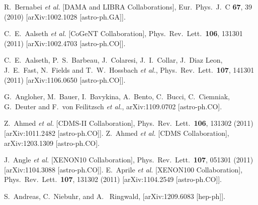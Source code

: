   R.~Bernabei {\it et al.}  [DAMA and LIBRA Collaborations],
  Eur.\ Phys.\ J.\ C {\bf 67}, 39 (2010)
  [arXiv:1002.1028 [astro-ph.GA]].

  C.~E.~Aalseth {\it et al.}  [CoGeNT Collaboration],
  Phys.\ Rev.\ Lett.\  {\bf 106}, 131301 (2011)
  [arXiv:1002.4703 [astro-ph.CO]].

  C.~E.~Aalseth, P.~S.~Barbeau, J.~Colaresi, J.~I.~Collar, J.~Diaz Leon, J.~E.~Fast, N.~Fields and T.~W.~Hossbach {\it et al.},
  Phys.\ Rev.\ Lett.\  {\bf 107}, 141301 (2011)
  [arXiv:1106.0650 [astro-ph.CO]].

  G.~Angloher, M.~Bauer, I.~Bavykina, A.~Bento, C.~Bucci, C.~Ciemniak, G.~Deuter and F.~von Feilitzsch {\it et al.},
  arXiv:1109.0702 [astro-ph.CO].

  Z.~Ahmed {\it et al.}  [CDMS-II Collaboration],
  Phys.\ Rev.\ Lett.\  {\bf 106}, 131302 (2011)
  [arXiv:1011.2482 [astro-ph.CO]].
  Z.~Ahmed {\it et al.}  [CDMS Collaboration],
  arXiv:1203.1309 [astro-ph.CO].

  J.~Angle {\it et al.}  [XENON10 Collaboration],
  Phys.\ Rev.\ Lett.\  {\bf 107}, 051301 (2011)
  [arXiv:1104.3088 [astro-ph.CO]].
  E.~Aprile {\it et al.}  [XENON100 Collaboration],
  Phys.\ Rev.\ Lett.\  {\bf 107}, 131302 (2011)
  [arXiv:1104.2549 [astro-ph.CO]].

S.~Andreas, C.~Niebuhr, and A. ~Ringwald,  [arXiv:1209.6083 [hep-ph]].


